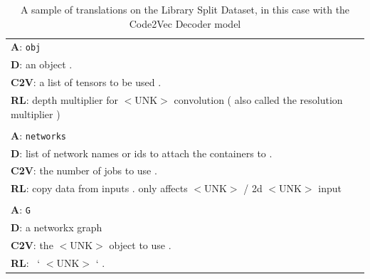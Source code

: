 \begin{table}[ht]
{\begin{tabular}{l}
    \textbf{A}: \texttt{obj}\\
    \textbf{D}: an object .\\
    \textbf{C2V}: a list of tensors to be used .\\
    \textbf{RL}: depth multiplier for $<$UNK$>$ convolution ( also called the resolution multiplier ) \\
    \\
    
    \textbf{A}: \texttt{networks}\\
    \textbf{D}: list of network names or ids to attach the containers to .\\
    \textbf{C2V}: the number of jobs to use .\\
    \textbf{RL}: copy data from inputs . only affects $<$UNK$>$ / 2d $<$UNK$>$ input \\
    \\
    
    \textbf{A}: \texttt{G}\\
    \textbf{D}: a networkx graph\\
    \textbf{C2V}: the $<$UNK$>$ object to use .\\
    \textbf{RL}: \ ` $<$UNK$>$ ` . \\

    \hline

    \hline
    \end{tabular}
    }

    \caption{A sample of translations on the Library Split Dataset, in this case with the Code2Vec Decoder model}
    \label{tab:lib_split}
\end{table}



